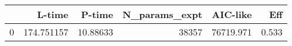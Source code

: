 \begin{tabular}{lrrrrr}
\toprule
{} &      L-time &    P-time &  N\_params\_expt &   AIC-like &    Eff \\
\midrule
0 &  174.751157 &  10.88633 &          38357 &  76719.971 &  0.533 \\
\bottomrule
\end{tabular}
